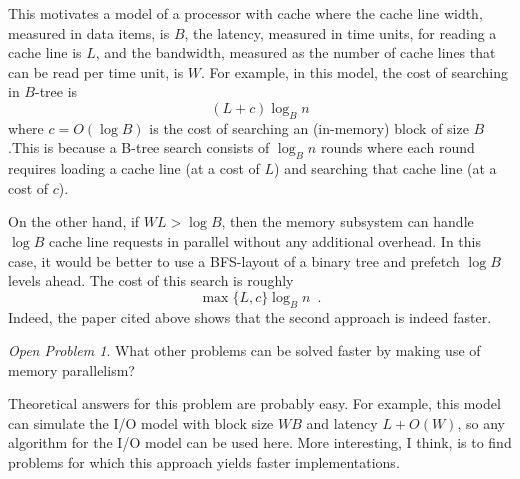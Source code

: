 \documentclass{article}
\theoremstyle{remark}
\newtheorem{op}{Open Problem}
\begin{document}
This motivates a model of a processor with cache where the cache line
width, measured in data items, is $B$, the latency, measured in time
units, for reading a cache line is $L$, and the bandwidth, measured as
the number of cache lines that can be read per time unit, is $W$.  For example, in this model, the cost of searching in $B$-tree is
\[
   (L+c)\log_B n
\]
where $c=O(\log B)$ is the cost of searching an (in-memory) block of size $B$.This is because a B-tree search consists of $\log_B n$
rounds where each round requires loading a cache line (at a cost of $L$)
and searching that cache line (at a cost of $c$).

On the other hand, if $WL > \log B$, then the memory subsystem can
handle $\log B$ cache line requests in parallel without any additional
overhead. In this case, it would be better to use a BFS-layout of a binary tree
and prefetch $\log B$ levels ahead.  The cost of this search is roughly 
\[
    \max\{L,c\}\log_B n \enspace .
\]
Indeed, the paper cited above shows that the second approach is indeed faster.

\begin{op}
  What other problems can be solved faster by making use of memory parallelism?
\end{op}

Theoretical answers for this problem are probably easy.  For example, this model can simulate the I/O model with block size $WB$ and latency $L+O(W)$, so any algorithm for the I/O model can be used here.  More interesting, I think, is to find problems for which this approach yields faster implementations.
\end{document}
